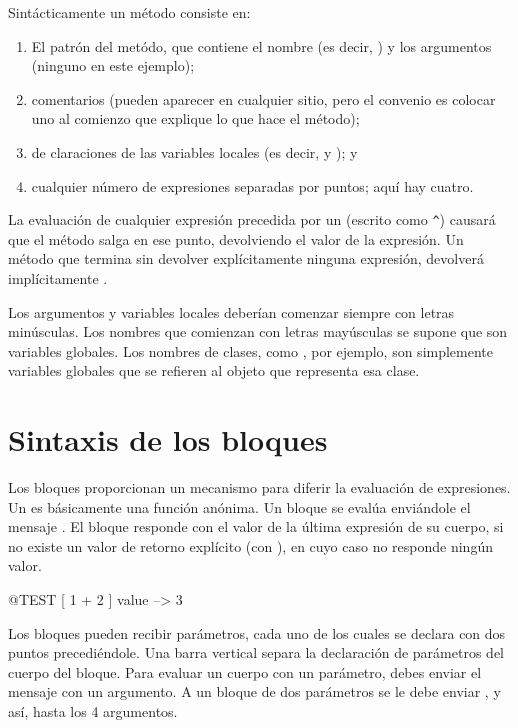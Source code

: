 \documentclass[a4paper,10pt,twoside]{book}
\begin{document}
Sintácticamente un método consiste en:
\begin{enumerate}
  \item El patrón del metódo, que contiene el nombre (es decir, ) y los argumentos (ninguno en este ejemplo);
  \item comentarios (pueden aparecer en cualquier sitio, pero el convenio es colocar uno al comienzo que explique lo que hace el método);
  \item de claraciones de las variables locales (es decir,  y ); y
  \item cualquier número de expresiones separadas por puntos; aquí hay cuatro.
\end{enumerate}

La evaluación de cualquier expresión precedida por un \ct{^} (escrito como \verb|^|) causará que el método salga en ese punto, devolviendo el valor de la expresión.
Un método que termina sin devolver explícitamente ninguna expresión, devolverá implícitamente .

Los argumentos y variables locales deberían comenzar siempre con letras minúsculas.
Los nombres que comienzan con letras mayúsculas se supone que son variables globales.
Los nombres de clases, como , por ejemplo, son simplemente variables globales que se refieren al objeto que representa esa clase.


\section{Sintaxis de los bloques}

Los bloques proporcionan un mecanismo para diferir la evaluación de expresiones.
Un  es básicamente una función anónima. Un bloque se evalúa enviándole el mensaje .
El bloque responde con el valor de la última expresión de su cuerpo, si no existe un valor de retorno explícito (con \ct{^}), en cuyo caso no responde ningún valor.

\begin{code}{@TEST}
[ 1 + 2 ] value --> 3
\end{code}

Los bloques pueden recibir parámetros, cada uno de los cuales se declara con dos puntos precediéndole. Una barra vertical separa la declaración de parámetros del cuerpo del bloque. Para evaluar un cuerpo con un parámetro, debes enviar el mensaje  con un argumento. A un bloque de dos parámetros se le debe enviar , y así, hasta los 4 argumentos.
\end{document}
